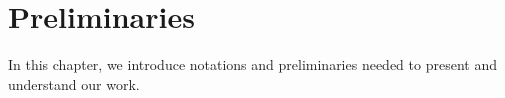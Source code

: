 \chapter{Preliminaries}
\label{ch:background}
In this chapter, we introduce notations and preliminaries needed to present and understand our work. 





